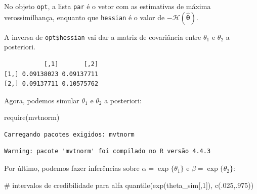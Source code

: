 \documentclass[
  letterpaper,
  DIV=11,
  numbers=noendperiod]{scrreprt}
\newenvironment{Shaded}{\begin{snugshade}}{\end{snugshade}}
\newcommand{\CommentTok}[1]{\textcolor[rgb]{0.37,0.37,0.37}{#1}}
\newcommand{\DecValTok}[1]{\textcolor[rgb]{0.68,0.00,0.00}{#1}}
\newcommand{\FunctionTok}[1]{\textcolor[rgb]{0.28,0.35,0.67}{#1}}
\newcommand{\NormalTok}[1]{\textcolor[rgb]{0.00,0.23,0.31}{#1}}
\newcommand{\OtherTok}[1]{\textcolor[rgb]{0.00,0.23,0.31}{#1}}
\newcommand{\SpecialCharTok}[1]{\textcolor[rgb]{0.37,0.37,0.37}{#1}}
\theoremstyle{plain}
\theoremstyle{definition}
\theoremstyle{definition}
\theoremstyle{remark}
\begin{document}
No objeto \texttt{opt}, a lista \texttt{par} é o vetor com as
estimativas de máxima verossimilhança, enquanto que \texttt{hessian} é o
valor de \(-\mathcal{H}(\hat{\boldsymbol{\theta}})\).

A inversa de \texttt{opt\$hessian} vai dar a matriz de covariância entre
\(\theta_1\) e \(\theta_2\) a posteriori.

\begin{Shaded}
\end{Shaded}

\begin{verbatim}
           [,1]       [,2]
[1,] 0.09138023 0.09137711
[2,] 0.09137711 0.10575762
\end{verbatim}

Agora, podemos simular \(\theta_1\) e \(\theta_2\) a posteriori:

\begin{Shaded}
\begin{Highlighting}[]
\FunctionTok{require}\NormalTok{(mvtnorm)}
\end{Highlighting}
\end{Shaded}

\begin{verbatim}
Carregando pacotes exigidos: mvtnorm
\end{verbatim}

\begin{verbatim}
Warning: pacote 'mvtnorm' foi compilado no R versão 4.4.3
\end{verbatim}

\begin{Shaded}
\end{Shaded}

Por último, podemos fazer inferências sobre \(\alpha=\exp\{\theta_1\}\)
e \(\beta=\exp\{\theta_2\}\):

\begin{Shaded}
\begin{Highlighting}[]
\CommentTok{\# intervalos de credibilidade para alfa}
\FunctionTok{quantile}\NormalTok{(}\FunctionTok{exp}\NormalTok{(theta\_sim[,}\DecValTok{1}\NormalTok{]), }\FunctionTok{c}\NormalTok{(.}\DecValTok{025}\NormalTok{,.}\DecValTok{975}\NormalTok{))}
\end{Highlighting}
\end{Shaded}
\end{document}
